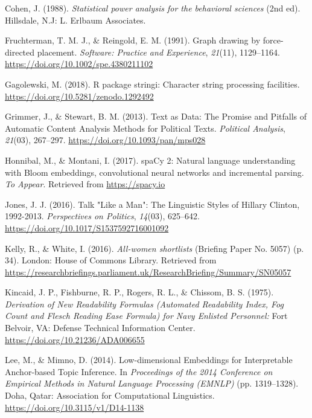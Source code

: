 \documentclass[]{article}
\theoremstyle{definition}
\theoremstyle{definition}
\theoremstyle{definition}
\theoremstyle{remark}
\begin{document}
\begin{table}[H]
\begin{table}[H]
\begin{table}[H]
\begin{table}[H]
\begin{table}[H]
\begin{table}[H]
\begin{table}[H]
\begin{table}[H]
\leavevmode\hypertarget{ref-cohen1988}{}%
Cohen, J. (1988). \emph{Statistical power analysis for the behavioral
sciences} (2nd ed). Hillsdale, N.J: L. Erlbaum Associates.

\leavevmode\hypertarget{ref-fruchterman1991}{}%
Fruchterman, T. M. J., \& Reingold, E. M. (1991). Graph drawing by
force-directed placement. \emph{Software: Practice and Experience},
\emph{21}(11), 1129--1164. \url{https://doi.org/10.1002/spe.4380211102}

\leavevmode\hypertarget{ref-gagolewski2018}{}%
Gagolewski, M. (2018). R package stringi: Character string processing
facilities. \url{https://doi.org/10.5281/zenodo.1292492}

\leavevmode\hypertarget{ref-grimmer2013}{}%
Grimmer, J., \& Stewart, B. M. (2013). Text as Data: The Promise and
Pitfalls of Automatic Content Analysis Methods for Political Texts.
\emph{Political Analysis}, \emph{21}(03), 267--297.
\url{https://doi.org/10.1093/pan/mps028}

\leavevmode\hypertarget{ref-honnibal2017}{}%
Honnibal, M., \& Montani, I. (2017). spaCy 2: Natural language
understanding with Bloom embeddings, convolutional neural networks and
incremental parsing. \emph{To Appear}. Retrieved from
\url{https://spacy.io}

\leavevmode\hypertarget{ref-jones2016}{}%
Jones, J. J. (2016). Talk "Like a Man": The Linguistic Styles of Hillary
Clinton, 1992-2013. \emph{Perspectives on Politics}, \emph{14}(03),
625--642. \url{https://doi.org/10.1017/S1537592716001092}

\leavevmode\hypertarget{ref-kelly2016}{}%
Kelly, R., \& White, I. (2016). \emph{All-women shortlists} (Briefing
Paper No. 5057) (p. 34). London: House of Commons Library. Retrieved
from
\url{https://researchbriefings.parliament.uk/ResearchBriefing/Summary/SN05057}

\leavevmode\hypertarget{ref-kincaid1975}{}%
Kincaid, J. P., Fishburne, R. P., Rogers, R. L., \& Chissom, B. S.
(1975). \emph{Derivation of New Readability Formulas (Automated
Readability Index, Fog Count and Flesch Reading Ease Formula) for Navy
Enlisted Personnel:} Fort Belvoir, VA: Defense Technical Information
Center. \url{https://doi.org/10.21236/ADA006655}

\leavevmode\hypertarget{ref-lee2014c}{}%
Lee, M., \& Mimno, D. (2014). Low-dimensional Embeddings for
Interpretable Anchor-based Topic Inference. In \emph{Proceedings of the
2014 Conference on Empirical Methods in Natural Language Processing
(EMNLP)} (pp. 1319--1328). Doha, Qatar: Association for Computational
Linguistics. \url{https://doi.org/10.3115/v1/D14-1138}


\end{table}
\end{table}
\end{table}
\end{table}
\end{table}
\end{table}
\end{table}
\end{table}
\end{document}
